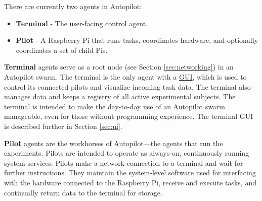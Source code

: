 There are currently two agents in Autopilot: 

\begin{itemize}
    \item \textbf{Terminal} - The user-facing control agent.
    \item \textbf{Pilot} - A Raspberry Pi that runs tasks, coordinates hardware, and optionally coordinates a set of child Pis.
\end{itemize}



\textbf{Terminal} agents serve as a root node (see Section \ref{sec:networking}) in an Autopilot swarm. The terminal is the only agent with a \hyperref[sec:ui]{GUI}, which is used to control its connected pilots and visualize incoming task data. The terminal also manages data and keeps a registry of all active experimental subjects. The terminal is intended to make the day-to-day use of an Autopilot swarm manageable, even for those without programming experience. The terminal GUI is described further in Section \ref{sec:ui}.

\textbf{Pilot} agents are the workhorses of Autopilot---the agents that run the experiments. Pilots are intended to operate as always-on, continuously running system services. Pilots make a network connection to a terminal and wait for further instructions. They maintain the system-level software used for interfacing with the hardware connected to the Raspberry Pi, receive and execute tasks, and continually return data to the terminal for storage.

